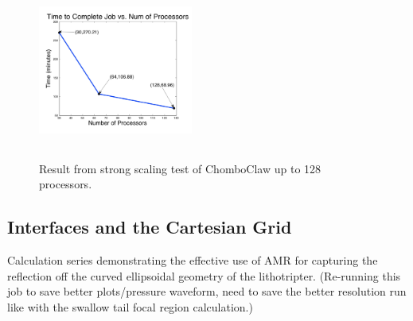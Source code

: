 \documentclass{article}
\begin{document}
\begin{figure}
\begin{center}
\includegraphics[height=2in, width=2in]{timing.pdf}
\label{fig:scaling}
\caption{Result from strong scaling test of ChomboClaw up to 128 processors.}
\end{center}
\end{figure}

\subsection{Interfaces and the Cartesian Grid}
\label{sec:interfaces}
Calculation series demonstrating the effective use of AMR for capturing the reflection off the curved 
ellipsoidal geometry of the lithotripter.  (Re-running this job to save better plots/pressure waveform, need 
to save the better resolution run like with the swallow tail focal region calculation.)
\end{document}
